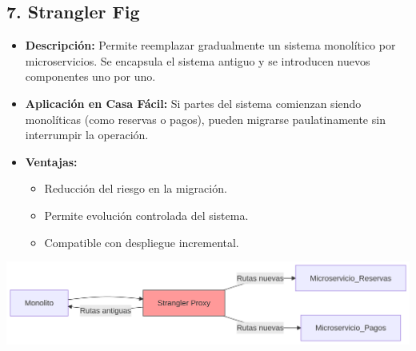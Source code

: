 	\subsection*{7. Strangler Fig}
		\begin{itemize}
			\item \textbf{Descripción:} Permite reemplazar gradualmente un sistema monolítico por microservicios. Se encapsula el sistema antiguo y se introducen nuevos componentes uno por uno.  
			\item \textbf{Aplicación en Casa Fácil:} Si partes del sistema comienzan siendo monolíticas (como reservas o pagos), pueden migrarse paulatinamente sin interrumpir la operación.  
			\item \textbf{Ventajas:}
			\begin{itemize}
				\item Reducción del riesgo en la migración.
				\item Permite evolución controlada del sistema.
				\item Compatible con despliegue incremental.
			\end{itemize}
		\end{itemize}
		\begin{center}
			\includegraphics[width=\linewidth]{figures/patterns/STRANGLER.png}
			\label{fig:img8}
		\end{center}